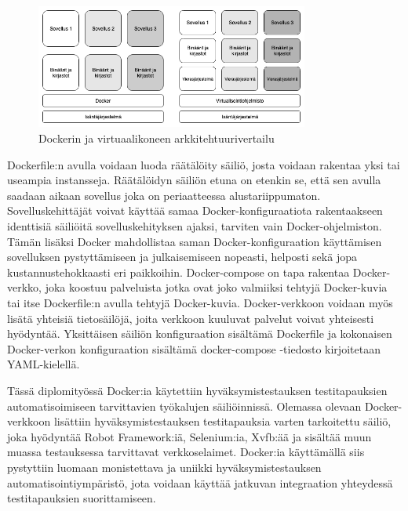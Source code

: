     \begin{figure}[H]
      \centering
      \includegraphics[width=0.8\textwidth]{assets/docker-vs-virtual-machine.png}
      \caption{Dockerin ja virtuaalikoneen arkkitehtuurivertailu \parencite{docker_vs_virtual_machine}}
      \label{fig:docker-vs-virtual-machine}
    \end{figure}

    Dockerfile:n avulla voidaan luoda räätälöity säiliö, josta voidaan rakentaa yksi tai useampia instansseja.
    Räätälöidyn säiliön etuna on etenkin se, että sen avulla saadaan aikaan sovellus joka on periaatteessa alustariippumaton.
    Sovelluskehittäjät voivat käyttää samaa Docker-konfiguraatiota rakentaakseen identtisiä säiliöitä sovelluskehityksen ajaksi, tarviten vain Docker-ohjelmiston.
    Tämän lisäksi Docker mahdollistaa saman Docker-konfiguraation käyttämisen sovelluksen pystyttämiseen ja julkaisemiseen nopeasti, helposti sekä jopa kustannustehokkaasti eri paikkoihin.
    Docker-compose on tapa rakentaa Docker-verkko, joka koostuu palveluista jotka ovat joko valmiiksi tehtyjä Docker-kuvia tai itse Dockerfile:n avulla tehtyjä Docker-kuvia.
    Docker-verkkoon voidaan myös lisätä yhteisiä tietosäilöjä, joita verkkoon kuuluvat palvelut voivat yhteisesti hyödyntää.
    Yksittäisen säiliön konfiguraation sisältämä Dockerfile ja kokonaisen Docker-verkon konfiguraation sisältämä docker-compose -tiedosto kirjoitetaan YAML-kielellä.

    Tässä diplomityössä Docker:ia käytettiin hyväksymistestauksen testitapauksien automatisoimiseen tarvittavien työkalujen säiliöinnissä.
    Olemassa olevaan Docker-verkkoon lisättiin hyväksymistestauksen testitapauksia varten tarkoitettu säiliö, joka hyödyntää Robot Framework:iä, Selenium:ia, Xvfb:ää ja sisältää muun muassa testauksessa tarvittavat verkkoselaimet.
    Docker:ia käyttämällä siis pystyttiin luomaan monistettava ja uniikki hyväksymistestauksen automatisointiympäristö, jota voidaan käyttää jatkuvan integraation yhteydessä testitapauksien suorittamiseen.

